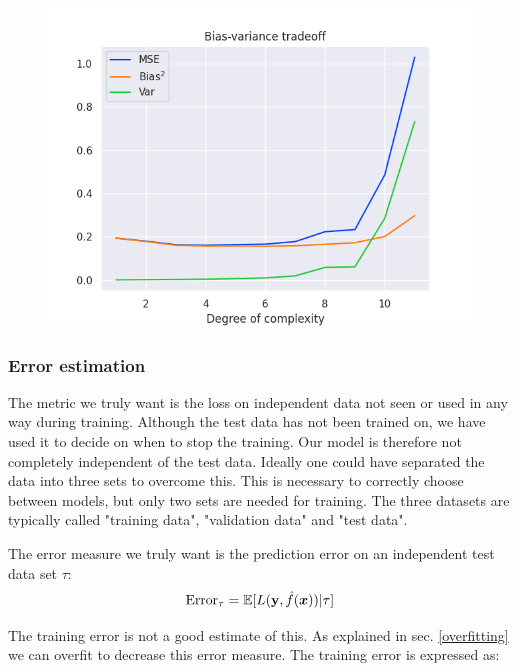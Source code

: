 \begin{figure}[h!]
\centering
\includegraphics[width=1\linewidth]{project_1/images/bias_var_bootstrap.png}\label{plot_overfit}
\caption{}
\label{train_test_overfit}
\end{figure}



\subsubsection{Error estimation}

The metric we truly want is the loss on independent data not seen or used in any way during training. Although the test data has not been trained on, we have used it to decide on when to stop the training. Our model is therefore not completely independent of the test data. Ideally one could have separated the data into three sets to overcome this. This is necessary to correctly choose between models, but only two sets are needed for training. The three datasets are typically called "training data", "validation data" and "test data". 


The error measure we truly want is the prediction error on an independent test data set $\tau$: 
\begin{equation}\label{error_test}
    \text{Error}_{\tau} = \mathbb{E}[L(\mathbf{y},\hat{f}(\boldsymbol{x})) | \tau]
\end{equation}

The training error is not a good estimate of this. As explained in sec. \ref{overfitting} we can overfit to decrease this error measure. The training error is expressed as: 

